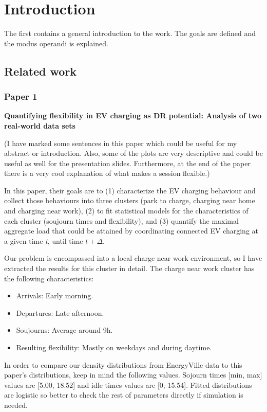 \chapter{Introduction}
\label{cha:intro}
The first contains a general introduction to the work. The goals are defined and the modus operandi is explained.

\section{Related work}
\subsection{Paper 1}
\textbf{Quantifying flexibility in EV charging as DR potential: Analysis of two real-world data sets}

(I have marked some sentences in this paper which could be useful for my abstract or introduction. Also, some of the plots are very descriptive and could be useful as well for the presentation slides. Furthermore, at the end of the paper there is a very cool explanation of what makes a session flexible.)

In this paper, their goals are to (1) characterize the EV charging behaviour and collect those behaviours into three clusters (park to charge, charging near home and charging near work), (2) to fit statistical models for the characteristics of each cluster (soujourn times and flexibility), and (3) quantify the maximal aggregate load that could be attained by coordinating connected EV charging at a given time \emph{t}, until time $t+\Delta$.

Our problem is encompassed into a local charge near work environment, so I have extracted the results for this cluster in detail. The charge near work cluster has the following characteristics:

\begin{itemize}
  \item Arrivals: Early morning.
  \item Departures: Late afternoon.
  \item Soujourns: Average around 9h.
  \item Resulting flexibility: Mostly on weekdays and during daytime.
\end{itemize}

In order to compare our density distributions from EnergyVille data to this paper's distributions, keep in mind the following values. Sojourn times [min, max] values are [5.00, 18.52] and idle times values are [0, 15.54]. Fitted distributions are logistic so better to check the rest of parameters directly if simulation is needed.

